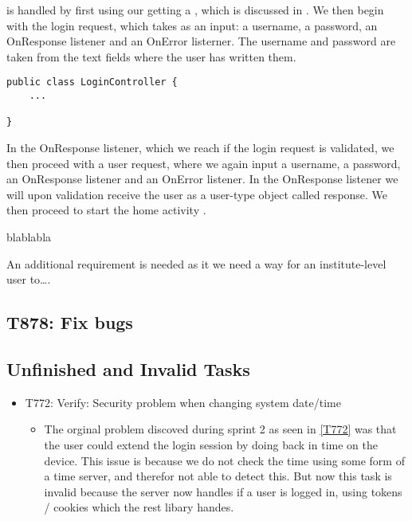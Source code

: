 is handled by first
using our getting a , which is discussed in . We then begin with the login
request, which takes as an input: a username, a password, an OnResponse
listener and an OnError listerner. The username and password are taken from the
text fields where the user has written them.

\begin{minipage}[H]{\linewidth}
\begin{lstlisting}[caption = ??? , label = loginController] 
public class LoginController {
	...
	
}
\end{lstlisting}
\end{minipage}

In the OnResponse listener, which we reach if the login request is validated, we
then proceed with a user request, where we again input a username, a password,
an OnResponse listener and an OnError listener. In the OnResponse listener we
will upon validation receive the user as a user-type object called response. We
then proceed to start the home activity .

blablabla

An additional requirement is needed as it we need a way for an institute-level
user to\ldots. 






\subsection{T878: Fix bugs}

\subsection{Unfinished and Invalid Tasks}\label{S4Invalid}
\begin{itemize}
  \item T772: Verify: Security problem when changing system date/time
  \begin{itemize}
  	\item The orginal problem discoved during sprint 2 as seen in \autoref{T772}
 	was that the user could extend the login session by doing back in time on the
  	device.
	This issue is because we do not check the time using some form of a time
	server, and therefor not able to detect this.  
	But now this task is invalid because the server now handles if a user is logged
	in, using tokens / cookies which the rest libary handes.
\end{itemize}

\end{itemize}
